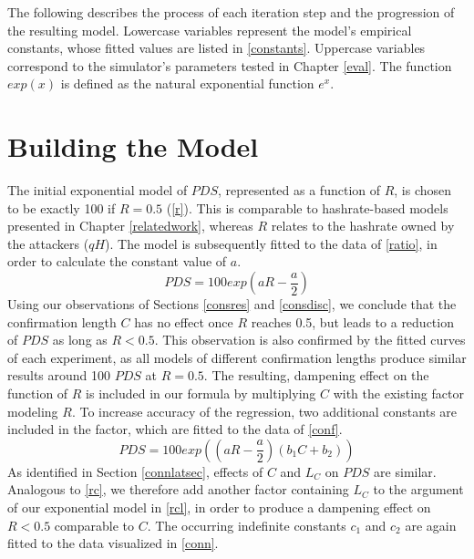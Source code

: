 \documentclass[a4paper,12pt,twoside]{report}
\begin{document}
The following describes the process of each iteration step and the progression of the resulting model. Lowercase variables represent the model's empirical constants, whose fitted values are listed in \autoref{constants}. Uppercase variables correspond to the simulator's parameters tested in Chapter \ref{eval}. The function $exp(x)$ is defined as the natural exponential function $e^x$.
\section{Building the Model} \label{building}
The initial exponential model of $PDS$, represented as a function of $R$, is chosen to be exactly 100 if $R = 0.5$ (\autoref{r}). This is comparable to hashrate-based models presented in Chapter \ref{relatedwork}, whereas $R$ relates to the hashrate owned by the attackers ($qH$).  The model is subsequently fitted to the data of \autoref{ratio}, in order to calculate the constant value of $a$.
\begin{equation}\label{r}
PDS = 100 exp \left(a R- \frac{a}{2} \right)
\end{equation}
Using our observations of Sections \ref{consres} and \ref{consdisc}, we conclude that the confirmation length $C$ has no effect once $R$ reaches 0.5, but leads to a reduction of $PDS$ as long as $R < 0.5$. This observation is also confirmed by the fitted curves of each experiment, as all models of different confirmation lengths produce similar results around 100 $PDS$ at $R = 0.5$. The resulting, dampening effect on the function of $R$ is included in our formula by multiplying $C$ with the existing factor modeling $R$. To increase accuracy of the regression, two additional constants are included in the factor, which are fitted to the data of \autoref{conf}.
\begin{equation}\label{rc}
PDS = 100 exp \left( \left( a R- \frac{a}{2} \right) \left( b_1C+b_2 \right) \right)
\end{equation}
As identified in Section \ref{connlatsec}, effects of $C$ and $L_C$ on $PDS$ are similar. Analogous to \autoref{rc}, we therefore add another factor containing $L_C$ to the argument of our exponential model in \autoref{rcl}, in order to produce a dampening effect on $R < 0.5$ comparable to $C$. The occurring indefinite constants $c_1$ and $c_2$ are again fitted to the data visualized in \autoref{conn}. 
\end{document}
